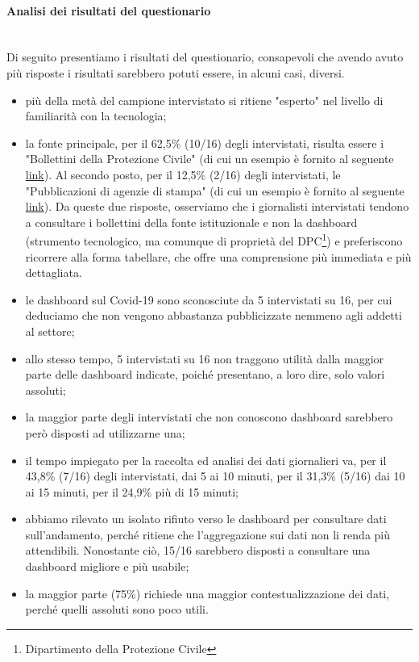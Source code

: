 \paragraph{Analisi dei risultati del questionario}\mbox{}\\
Di seguito presentiamo i risultati del questionario, consapevoli che avendo avuto più risposte i risultati sarebbero potuti essere, in alcuni casi, diversi.
\begin{itemize}
    \item più della metà del campione intervistato si ritiene "esperto" nel livello di familiarità con la tecnologia;
    \item la fonte principale, per il 62,5\% (10/16) degli intervistati, risulta essere i "Bollettini della Protezione Civile" (di cui un esempio è fornito al seguente \href{https://github.com/pcm-dpc/COVID-19/blob/master/schede-riepilogative/regioni/dpc-covid19-ita-scheda-regioni-latest.pdf}{link}). Al secondo posto, per il 12,5\% (2/16) degli intervistati, le "Pubblicazioni di agenzie di stampa" (di cui un esempio è fornito al seguente \href{https://www.ansa.it/canale_saluteebenessere/notizie/sanita/2021/01/02/covid-11.831-nuovi-casi-in-24-ore-364-vittime-_96b5a8cb-4922-492b-87ac-9d9c9590cca4.html}{link}).
    Da queste due risposte, osserviamo che i giornalisti intervistati tendono a consultare i bollettini della fonte istituzionale e non la dashboard (strumento tecnologico, ma comunque di proprietà del DPC\footnote{Dipartimento della Protezione Civile}) e preferiscono ricorrere alla forma tabellare, che offre una comprensione più immediata e più dettagliata.
    \item le dashboard sul Covid-19 sono sconosciute da 5 intervistati su 16, per cui deduciamo che non vengono abbastanza pubblicizzate nemmeno agli addetti al settore;
    \item allo stesso tempo, 5 intervistati su 16 non traggono utilità dalla maggior parte delle dashboard indicate, poiché presentano, a loro dire, solo valori assoluti;
    \item la maggior parte degli intervistati che non conoscono dashboard sarebbero però disposti ad utilizzarne una;
    \item il tempo impiegato per la raccolta ed analisi dei dati giornalieri va, per il 43,8\% (7/16) degli intervistati, dai 5 ai 10 minuti, per il 31,3\% (5/16) dai 10 ai 15 minuti, per il 24,9\% più di 15 minuti;
    \item abbiamo rilevato un isolato rifiuto verso le dashboard per consultare dati sull'andamento, perché ritiene che l'aggregazione sui dati non li renda più attendibili. Nonostante ciò, 15/16 sarebbero disposti a consultare una dashboard migliore e più usabile;
    \item la maggior parte (75\%) richiede una maggior contestualizzazione dei dati, perché quelli assoluti sono poco utili.
\end{itemize}

